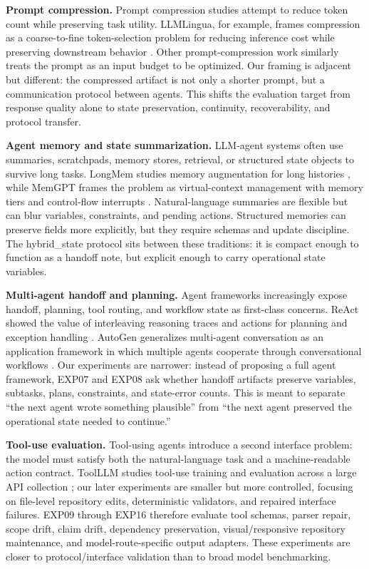 \documentclass[11pt]{article}
\begin{document}
\textbf{Prompt compression.} Prompt compression studies attempt to reduce token count while preserving task utility. LLMLingua, for example, frames compression as a coarse-to-fine token-selection problem for reducing inference cost while preserving downstream behavior \cite{jiang2023llmlingua}. Other prompt-compression work similarly treats the prompt as an input budget to be optimized. Our framing is adjacent but different: the compressed artifact is not only a shorter prompt, but a communication protocol between agents. This shifts the evaluation target from response quality alone to state preservation, continuity, recoverability, and protocol transfer.

\textbf{Agent memory and state summarization.} LLM-agent systems often use summaries, scratchpads, memory stores, retrieval, or structured state objects to survive long tasks. LongMem studies memory augmentation for long histories \cite{wang2023longmem}, while MemGPT frames the problem as virtual-context management with memory tiers and control-flow interrupts \cite{packer2023memgpt}. Natural-language summaries are flexible but can blur variables, constraints, and pending actions. Structured memories can preserve fields more explicitly, but they require schemas and update discipline. The hybrid\_state protocol sits between these traditions: it is compact enough to function as a handoff note, but explicit enough to carry operational state variables.

\textbf{Multi-agent handoff and planning.} Agent frameworks increasingly expose handoff, planning, tool routing, and workflow state as first-class concerns. ReAct showed the value of interleaving reasoning traces and actions for planning and exception handling \cite{yao2023react}. AutoGen generalizes multi-agent conversation as an application framework in which multiple agents cooperate through conversational workflows \cite{wu2023autogen}. Our experiments are narrower: instead of proposing a full agent framework, EXP07 and EXP08 ask whether handoff artifacts preserve variables, subtasks, plans, constraints, and state-error counts. This is meant to separate ``the next agent wrote something plausible'' from ``the next agent preserved the operational state needed to continue.''

\textbf{Tool-use evaluation.} Tool-using agents introduce a second interface problem: the model must satisfy both the natural-language task and a machine-readable action contract. ToolLLM studies tool-use training and evaluation across a large API collection \cite{qin2023toolllm}; our later experiments are smaller but more controlled, focusing on file-level repository edits, deterministic validators, and repaired interface failures. EXP09 through EXP16 therefore evaluate tool schemas, parser repair, scope drift, claim drift, dependency preservation, visual/responsive repository maintenance, and model-route-specific output adapters. These experiments are closer to protocol/interface validation than to broad model benchmarking.
\end{document}
